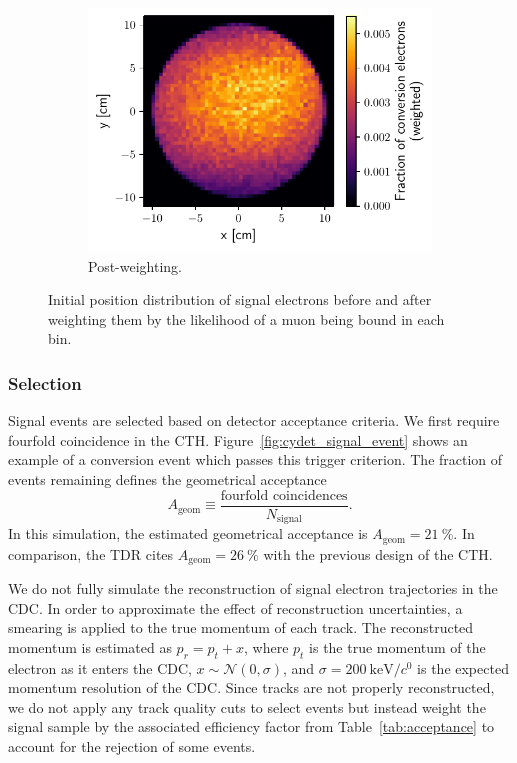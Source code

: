 \begin{figure}
\begin{subfigure}[t]{0.329\textwidth}
        \centering
        \includegraphics[width=\textwidth]{chapter6/weighted_conversion_position_distribution.pdf}
        \caption{Post-weighting.}
    \end{subfigure}
    \caption{ Initial position distribution of signal electrons before and after
        weighting them by the likelihood of a muon being bound in each bin. }
    \label{fig:stopping_position_reweighting}
\end{figure}


\subsubsection{Selection}
Signal events are selected based on detector acceptance criteria. We first
require fourfold coincidence in the CTH. Figure~\ref{fig:cydet_signal_event}
shows an example of a conversion event which passes this trigger criterion. The
fraction of events remaining defines the geometrical acceptance 
$$
A_\mathrm{geom} \equiv  \frac{\text{fourfold coincidences}}{N_\mathrm{signal}}.
$$
In this simulation, the estimated geometrical acceptance is $A_\mathrm{geom} =
\SI{21}{\percent}$. In comparison, the TDR cites $A_\mathrm{geom} =
\SI{26}{\percent}$ with the previous design of the CTH.


We do not fully simulate the reconstruction of signal electron trajectories in
the CDC. In order to approximate the effect of reconstruction uncertainties, a
smearing is applied to the true momentum of each track. The reconstructed
momentum is estimated as $p_r = p_t + x$, where $p_t$ is the true momentum of
the electron as it enters the CDC, $x \sim \mathcal{N}(0, \sigma)$, and $\sigma
= \SI{200}{\keV/\clight}$ is the expected momentum resolution of the CDC. Since
tracks are not properly reconstructed, we do not apply any track quality cuts to
select events but instead weight the signal sample by the associated efficiency
factor from Table~\ref{tab:acceptance} to account for the rejection of some events.

